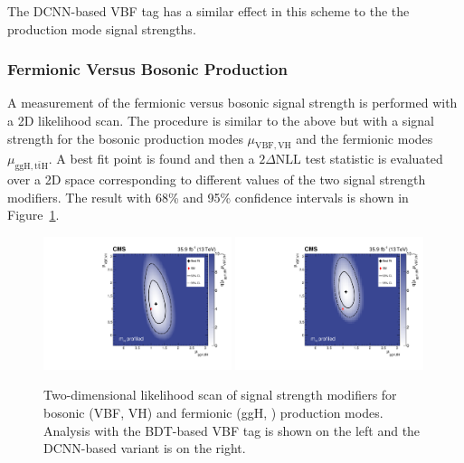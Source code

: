 The DCNN-based VBF tag has a similar effect in this scheme to the the production mode signal strengths. 






\subsubsection{Fermionic Versus Bosonic Production}
A measurement of the fermionic versus bosonic signal strength is performed with a 2D likelihood scan.
The procedure is similar to the above but with a signal strength for the bosonic production modes $\mu_{\mathrm{VBF},\mathrm{VH}}$ and the fermionic modes $\mu_{\mathrm{ggH},\mathrm{t\bar{t}H}}$.
A best fit point is found and then a $2\Delta\mathrm{NLL}$ test statistic is evaluated over a 2D space corresponding to different values of the two signal strength modifiers. 
The result with 68\% and 95\% confidence intervals is shown in Figure~\ref{fig:stats_results:fermionic_bosonic}. 
\begin{figure}[h!]
    \begin{center}
        \includegraphics[width=0.49\textwidth]{figures/stats_results/CMS-HIG-16-040_Figure_019.pdf}
        \includegraphics[width=0.49\textwidth]{figures/stats_results/RVRFScanProfileMH_col.pdf}
    \end{center}
    \caption{Two-dimensional likelihood scan of signal strength modifiers for bosonic (VBF, VH) and fermionic (ggH, \ttH) production modes. Analysis with the BDT-based VBF tag is shown on the left and the DCNN-based variant is on the right.}
        \label{fig:stats_results:fermionic_bosonic}
\end{figure}

